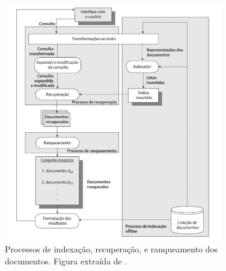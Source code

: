 \begin{figure}[h]
    \centering
    \includegraphics[width=0.85\textwidth]{img/baeza2013-figura-1-3.png}
    \caption{Processos de indexação, recuperação, e ranqueamento dos documentos. Figura extraída de .}
    \label{fig:diagrama-baeza2013-fig1-3}
\end{figure}